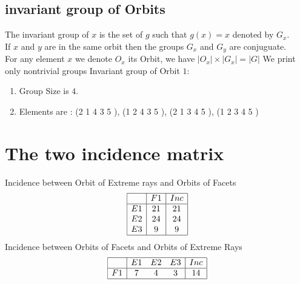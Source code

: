 \documentclass[12pt]{article}
\begin{document}
\subsection{invariant group of Orbits}
\noindent The invariant group of $x$ is the set of $g$ such that $g(x)=x$ denoted by $G_x$.\\
If $x$ and $y$ are in the same orbit then the groups $G_x$ and  $G_y$ are conjuguate.\\
For any element $x$ we denote $O_x$ its Orbit, we have $|O_x|\times |G_x|=|G|$
We print only nontrivial groups
Invariant group of Orbit $1$:
\begin{enumerate}
\item Group Size is $4$.
\item Elements are : (2 1 4 3 5  ), (1 2 4 3 5  ), (2 1 3 4 5  ), (1 2 3 4 5  )
\end{enumerate}
\section{The two incidence matrix}
Incidence between Orbit of Extreme rays and Orbits of Facets
\begin{equation*}
\begin{array}{|c|c|c|}
\hline
&F1&Inc\\
\hline
E1&21&21\\
E2&24&24\\
E3&9&9\\
\hline
\end{array}
\end{equation*}
Incidence between Orbits of Facets and Orbits of Extreme Rays
\begin{equation*}
\begin{array}{|c|ccc|c|}
\hline
&E1&E2&E3&Inc\\
\hline
F1&7&4&3&14\\
\hline
\end{array}
\end{equation*}
\end{document}
